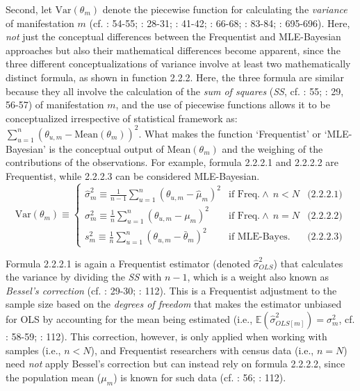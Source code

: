 \documentclass[
  10pt,
  a4paper,
  twoside]{article}
\begin{document}
Second, let \(\text{Var}(\theta_m)\) denote the piecewise function for calculating the \emph{variance} of manifestation \(m\) (cf. : 54-55; : 28-31; : 41-42; : 66-68; : 83-84; : 695-696). Here, \emph{not} just the conceptual differences between the Frequentist and MLE-Bayesian approaches but also their mathematical differences become apparent, since the three different conceptualizations of variance involve at least two mathematically distinct formula, as shown in function 2.2.2. Here, the three formula are similar because they all involve the calculation of the \emph{sum of squares} (\emph{SS}, cf. : 55; : 29, 56-57) of manifestation \(m\), and the use of piecewise functions allows it to be conceptualized irrespective of statistical framework as: \(\sum_{u=1}^{n} (\theta_{u,m} - \text{Mean}(\theta_m))^2\). What makes the function `Frequentist' or `MLE-Bayesian' is the conceptual output of \(\text{Mean}(\theta_m)\) and the weighing of the contributions of the observations. For example, formula 2.2.2.1 and 2.2.2.2 are Frequentist, while 2.2.2.3 can be considered MLE-Bayesian.
\[
\text{Var}(\theta_m) \equiv
\left\{
\begin{array}{lll}
  \hat{\sigma}^2_m \equiv \frac{1}{n - 1} \sum_{u=1}^{n} (\theta_{u,m} - \hat{\mu}_m)^2 & \text{if Freq.} \land\ n < N & \text{(2.2.2.1)} \\
  \sigma^2_m \equiv \frac{1}{n} \sum_{u=1}^{n} (\theta_{u,m} - \mu_m)^2 & \text{if Freq.} \land\ n = N & \text{(2.2.2.2)} \\
  s^2_m \equiv \frac{1}{n} \sum_{u=1}^{n} (\theta_{u,m} - \bar{\theta}_m)^2 & \text{if MLE-Bayes.} & \text{(2.2.2.3)}
\end{array}
\right.
\tag{2.2.2}
\]

Formula 2.2.2.1 is again a Frequentist estimator (denoted \(\hat{\sigma}^2_{OLS}\)) that calculates the variance by dividing the \emph{SS} with \(n - 1\), which is a weight also known as \emph{Bessel's correction} (cf. : 29-30; : 112). This is a Frequentist adjustment to the sample size based on the \emph{degrees of freedom} that makes the estimator unbiased for OLS by accounting for the mean being estimated (i.e., \(\mathbb{E}(\hat{\sigma}^2_{OLS[m]}) = \sigma^2_m\), cf. : 58-59; : 112). This correction, however, is only applied when working with samples (i.e., \(n < N\)), and Frequentist researchers with census data (i.e., \(n = N\)) need \emph{not} apply Bessel's correction but can instead rely on formula 2.2.2.2, since the population mean (\(\mu_m\)) is known for such data (cf. : 56; : 112).
\end{document}
